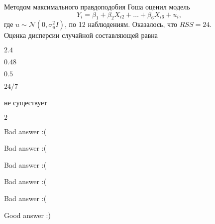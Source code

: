 
\begin{question}
Методом максимального правдоподобия Гоша оценил модель
\[
Y_i = \beta_1 + \beta_2 X_{i2} +  \ldots  + \beta _6 X_{i6} + u_i,
\]
где \(u \sim \mathcal{N} (0,\sigma_u^2I)\), по 12 наблюдениям. Оказалось, что \(RSS = 24\).\\
Оценка дисперсии случайной составляющей равна
\begin{answerlist}
  \item \(2.4\)
  \item \(0.48\)
  \item \(0.5\)
  \item \(24/7\)
  \item не существует
  \item \(2\)
\end{answerlist}
\end{question}

\begin{solution}
\begin{answerlist}
  \item Bad answer :(
  \item Bad answer :(
  \item Bad answer :(
  \item Bad answer :(
  \item Bad answer :(
  \item Good answer :)
\end{answerlist}
\end{solution}

